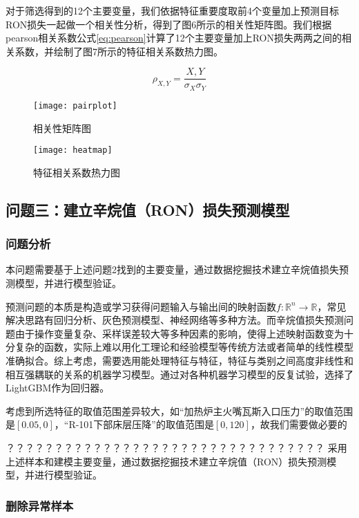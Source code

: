 \documentclass[bwprint]{gmcmthesis}
\begin{document}
对于筛选得到的12个主要变量，我们依据特征重要度取前4个变量加上预测目标RON损失一起做一个相关性分析，得到了图6所示的相关性矩阵图。我们根据pearson相关系数公式\eqref{eq:pearson}计算了12个主要变量加上RON损失两两之间的相关系数，并绘制了图7所示的特征相关系数热力图。

\begin{equation}\label{eq:pearson}
	\rho_{X,Y}=\frac{X,Y}{\sigma_X\sigma_Y}
\end{equation}


\begin{figure}[htb]
	\centering
	\texttt{[image: pairplot]}
	\caption{相关性矩阵图}
\end{figure}

\begin{figure}[htb]
	\centering
	\texttt{[image: heatmap]}
	\caption{特征相关系数热力图}
\end{figure}


\FloatBarrier
\subsection{问题三：建立辛烷值（RON）损失预测模型}\label{sec:modeling}

\FloatBarrier
\subsubsection{问题分析}

本问题需要基于上述问题2找到的主要变量，通过数据挖掘技术建立辛烷值损失预测模型，并进行模型验证。

预测问题的本质是构造或学习获得问题输入与输出间的映射函数$f: \mathbb{R}^n \rightarrow \mathbb{R}$，常见解决思路有回归分析、灰色预测模型、神经网络等多种方法。而辛烷值损失预测问题由于操作变量复杂、采样误差较大等多种因素的影响，使得上述映射函数变为十分复杂的函数，实际上难以用化工理论和经验模型等传统方法或者简单的线性模型准确拟合。综上考虑，需要选用能处理特征与特征，特征与类别之间高度非线性和相互强耦联的关系的机器学习模型。通过对各种机器学习模型的反复试验，选择了LightGBM作为回归器。

考虑到所选特征的取值范围差异较大，如“加热炉主火嘴瓦斯入口压力”的取值范围是$[0.05, 0]$，“R-101下部床层压降”的取值范围是$[0, 120]$，故我们需要做必要的

？？？？？？？？？？？？？？？？？？？？？？？？？？？？？？？？？
采用上述样本和建模主要变量，通过数据挖掘技术建立辛烷值（RON）损失预测模型，并进行模型验证。 


\FloatBarrier
\subsubsection{删除异常样本}
\end{document}
